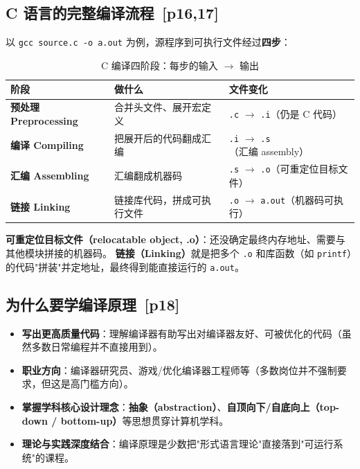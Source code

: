 \documentclass[UTF8,fontset=none,11pt]{ctexart}
\newenvironment{notebox}[1][]{%
  \par\medskip\noindent{\color{maincol}\rule{\linewidth}{1.1pt}}\par\nopagebreak
  \noindent{\bfseries\color{maincol}#1}\par\nopagebreak\smallskip}%
  {\par\nopagebreak\smallskip\noindent{\color{maincol}\rule{\linewidth}{0.4pt}}\par\medskip}
\newcommand{\pg}[1]{{\small\color{gray}\,[p#1]}}
\begin{document}
\subsection{C 语言的完整编译流程 \pg{16,17}}
以 \texttt{gcc source.c -o a.out} 为例，源程序到可执行文件经过\textbf{四步}：

\begin{table}[h]\centering\small
\caption{C 编译四阶段：每步的输入 $\to$ 输出}
\begin{tabular}{>{\bfseries}l l l}
\toprule
阶段 & 做什么 & 文件变化 \\
\midrule
预处理 Preprocessing & 合并头文件、展开宏定义 & \texttt{.c} $\to$ \texttt{.i}（仍是 C 代码）\\
编译 Compiling      & 把展开后的代码翻成汇编 & \texttt{.i} $\to$ \texttt{.s}（汇编 assembly）\\
汇编 Assembling     & 汇编翻成机器码 & \texttt{.s} $\to$ \texttt{.o}（可重定位目标文件）\\
链接 Linking        & 链接库代码，拼成可执行文件 & \texttt{.o} $\to$ \texttt{a.out}（机器码可执行）\\
\bottomrule
\end{tabular}
\end{table}

\begin{notebox}[术语小贴士]
\textbf{可重定位目标文件（relocatable object, .o）}：还没确定最终内存地址、需要与其他模块拼接的机器码。
\textbf{链接（Linking）}就是把多个 \texttt{.o} 和库函数（如 \texttt{printf}）的代码"拼装"并定地址，最终得到能直接运行的 \texttt{a.out}。
\end{notebox}

\subsection{为什么要学编译原理 \pg{18}}
\begin{itemize}
  \item \textbf{写出更高质量代码}：理解编译器有助写出对编译器友好、可被优化的代码（虽然多数日常编程并不直接用到）。
  \item \textbf{职业方向}：编译器研究员、游戏/优化编译器工程师等（多数岗位并不强制要求，但这是高门槛方向）。
  \item \textbf{掌握学科核心设计理念}：\textbf{抽象（abstraction）}、\textbf{自顶向下/自底向上（top-down / bottom-up）}等思想贯穿计算机学科。
  \item \textbf{理论与实践深度结合}：编译原理是少数把"形式语言理论"直接落到"可运行系统"的课程。
\end{itemize}
\end{document}

